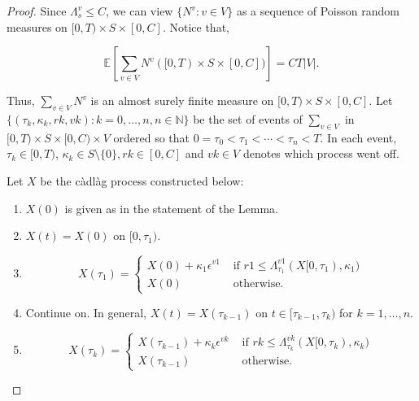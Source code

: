\documentclass[12pt]{article}
\newcommand{\mb}{\mathbb}
\newcommand{\te}{\text}
\newcommand{\ep}{\epsilon}
\newcommand{\ind}{\hspace{24pt}}
\newcommand{\ex}[1]{\mb{E}\left[#1\right]}			%
\renewcommand{\v}{v}							%
\renewcommand{\S}{S}							%
\newcommand{\ev}{\ep}							%
\newcommand{\T}{T}								%
\renewcommand{\t}{t}							%
\renewcommand{\tt}{s}							%
\newcommand{\X}{X}								%
\newcommand{\vind}[1]{^{#1}}					%
\newcommand{\tp}[1]{(#1)}						%
\newcommand{\tip}[1]{#1}						%
\newcommand{\ts}[1]{_{#1}}						%
\newcommand{\const}{C}							%
\newcommand{\poiss}{N}							%
\renewcommand{\r}{r}							%
\newcommand{\indx}[1]{_{#1}}					%
\newcommand{\rt}{\tau}							%
\renewcommand{\it}{k}							%
\renewcommand{\mark}{\kappa}					%
\newcommand{\ratee}{\Lambda}					%
\begin{document}
\begin{proof}
Since \(\ratee\ts{\tt}\vind{\v} \leq \const\), we can view \(\{\poiss\vind{\v}:\v\in V\}\) as a sequence of Poisson random measures on \([0,\T)\times \S\times [0,\const]\). Notice that,

\[\ex{\sum_{\v\in V}\poiss\vind{\v}([0,\T)\times\S\times[0,\const])} = \const\T|V|.\]

Thus, \(\sum_{\v\in V}\poiss\vind{\v}\) is an almost surely finite measure on \([0,\T)\times \S\times [0,\const]\). Let \(\{(\rt\indx{\it},\mark\indx{\it},\r{\it},\v{\it}):\it = 0,\dots,n, n\in \mb{N}\}\) be the set of events of \(\sum_{\v\in V}\) in \([0,\T)\times\S\times [0,\const)\times V\) ordered so that \(0=\rt\indx{0} < \rt\indx{1} < \cdots < \rt\indx{n} < \T\). In each event, \(\rt\indx{\it} \in [0,\T)\), \(\mark\indx{\it}\in \S\setminus\{0\}, \r{\it} \in [0,\const]\) and \(\v{\it} \in V\) denotes which process went off.

\ind Let \(\X\) be the c\`adl\`ag process constructed below:

\begin{enumerate}
\item \(\X\tp{0}\) is given as in the statement of the Lemma.

\item \(\X\tp{\t} = \X\tp{0}\) on \([0,\rt\indx{1})\).

\item 

\[\X\tp{\rt\indx{1}} = \begin{cases}
\X\tp{0} + \mark\indx{1}\ev\vind{\v{1}} &\te{ if } \r{1} \leq \ratee\ts{\rt\indx{1}}\vind{\v{1}}(\X\tip{[0,\rt\indx{1})},\mark\indx{1})\\
\X\tp{0} &\te{ otherwise.}
\end{cases}
\] 

\item Continue on. In general, \(\X\tp{\t} = \X\tp{\rt\indx{\it-1}}\) on \(\t \in [\rt\indx{\it-1},\rt\indx{\it})\) for \(\it= 1,\dots,n\).

\item 

\[\X\tp{\rt\indx{\it}} = \begin{cases}
\X\tp{\rt\indx{\it-1}} + \mark\indx{\it}\ev\vind{\v{\it}} &\te{ if } \r{\it} \leq \ratee\ts{\rt\indx{\it}}\vind{\v{\it}}(\X\tip{[0,\rt\indx{\it})},\mark\indx{\it})\\
\X\tp{\rt\indx{\it-1}} &\te{ otherwise.}
\end{cases}\]


\end{enumerate}
\end{proof}
\end{document}
